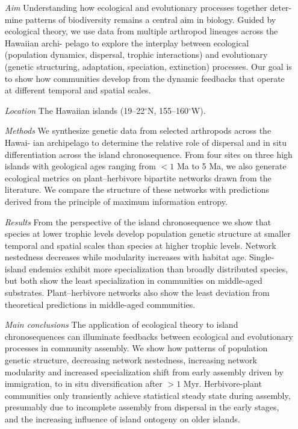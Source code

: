 \begin{itemize}
\item[\emph{Aim}] Understanding how ecological and evolutionary processes
  together deter- mine patterns of biodiversity remains a central aim
  in biology. Guided by ecological theory, we use data from multiple
  arthropod lineages across the Hawaiian archi- pelago to explore the
  interplay between ecological (population dynamics, dispersal,
  trophic interactions) and evolutionary (genetic structuring,
  adaptation, speciation, extinction) processes. Our goal is to show
  how communities develop from the dynamic feedbacks that operate at
  different temporal and spatial scales.
%
\item[\emph{Location}] The Hawaiian islands (19--22$^\circ$N, 155--160$^\circ$W).
%
\item[\emph{Methods}] We synthesize genetic data from selected
  arthropods across the Hawai- ian archipelago to determine the
  relative role of dispersal and in situ differentiation across the
  island chronosequence. From four sites on three high islands with
  geological ages ranging from $< 1$ Ma to 5 Ma, we also generate
  ecological metrics on plant–herbivore bipartite networks drawn from
  the literature. We compare the structure of these networks with
  predictions derived from the principle of maximum information
  entropy.
%
\item[\emph{Results}] From the perspective of the island chronosequence we
  show that species at lower trophic levels develop population genetic
  structure at smaller temporal and spatial scales than species at
  higher trophic levels. Network nestedness decreases while modularity
  increases with habitat age. Single-island endemics exhibit more
  specialization than broadly distributed species, but both show the
  least specialization in communities on middle-aged
  substrates. Plant–herbivore networks also show the least deviation
  from theoretical predictions in middle-aged communities.
%
\item[\emph{Main conclusions}] The application of ecological theory to island
  chronosequences can illuminate feedbacks between ecological and
  evolutionary processes in community assembly. We show how patterns
  of population genetic structure, decreasing network nestedness,
  increasing network modularity and increased specialization shift
  from early assembly driven by immigration, to in situ
  diversification after $> 1$ Myr. Herbivore-plant communities only
  transiently achieve statistical steady state during assembly,
  presumably due to incomplete assembly from dispersal in the early
  stages, and the increasing influence of island ontogeny on older
  islands.
\end{itemize}

